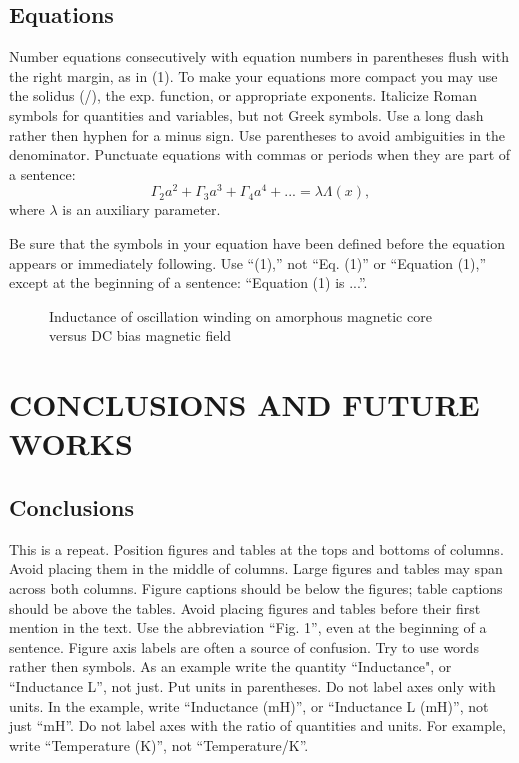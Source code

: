 \documentclass[a4paper, 10pt, conference]{ieeeconf}      %
\begin{document}
\subsection{Equations}

Number equations consecutively with equation numbers in parentheses flush
 with the right margin, as in (1). To make your equations more compact
 you may use the solidus (/), the exp. function, or appropriate exponents.
  Italicize Roman symbols for quantities and variables, but not Greek symbols.
   Use a long dash rather then hyphen for a minus sign. Use parentheses to avoid
    ambiguities in the denominator.
Punctuate equations with commas or periods when they are part of a sentence:
$$\Gamma_2 a^2 + \Gamma_3 a^3 + \Gamma_4 a^4 + ... = \lambda \Lambda(x),$$
where $\lambda$ is an auxiliary parameter.

Be sure that the symbols in your equation have been defined before the
equation appears or immediately following.
Use ``(1),'' not ``Eq. (1)'' or ``Equation (1),''
except at the beginning of a sentence: ``Equation (1) is ...''.

   \begin{figure}[thpb]
      \centering
      \caption{Inductance of oscillation winding on amorphous
       magnetic core versus DC bias magnetic field}
      \label{figurelabel}
   \end{figure}

\section{CONCLUSIONS AND FUTURE WORKS}

\subsection{Conclusions}

This is a repeat.
Position figures and tables at the tops and bottoms of columns.
Avoid placing them in the middle of columns. Large figures and tables
may span across both columns. Figure captions should be below the figures;
 table captions should be above the tables. Avoid placing figures and tables
  before their first mention in the text. Use the abbreviation ``Fig. 1'',
  even at the beginning of a sentence.
Figure axis labels are often a source of confusion.
Try to use words rather then symbols. As an example write the quantity ``Inductance",
 or ``Inductance L'', not just.
 Put units in parentheses. Do not label axes only with units.
 In the example, write ``Inductance (mH)'', or ``Inductance L (mH)'', not just ``mH''.
 Do not label axes with the ratio of quantities and units.
 For example, write ``Temperature (K)'', not ``Temperature/K''.
\end{document}
